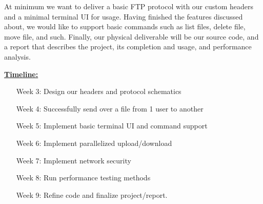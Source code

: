 \documentclass[12pt]{article}
\begin{document}
	At minimum we want to deliver a basic FTP protocol with our custom headers and a minimal terminal UI for usage. Having finished the features discussed about, we would like to support basic commands such as list files, delete file, move file, and such. Finally, our physical deliverable will be our source code, and a report that describes the project, its completion and usage, and performance analysis.

\begin{flushleft}
	\large{\underline{\textbf{Timeline:}}}
\end{flushleft}
	\vspace{-7.5px}
	
	\begin{itemize}[leftmargin=2.5cm,noitemsep,nolistsep]
		\item[Week 3:] Design our headers and protocol schematics
		\item[Week 4:] Successfully send over a file from 1 user to another
		\item[Week 5:] Implement basic terminal UI and command support
		\item[Week 6:] Implement parallelized upload/download
		\item[Week 7:] Implement network security
		\item[Week 8:] Run performance testing methods
		\item[Week 9:] Refine code and finalize project/report.	
	\end{itemize}

	
			
	
\end{document}
